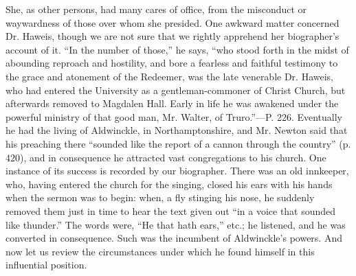 She, as other persons, had many cares of office,
from the misconduct or waywardness of those over whom she presided.
One awkward matter concerned Dr. Haweis, though we are not sure
that we rightly apprehend her biographer's account of it. ``In the
number of those,'' he says, ``who stood forth in the midst of
abounding reproach and hostility, and bore a fearless and faithful
testimony to the grace and atonement of the Redeemer, was the late
venerable Dr. Haweis, who had entered the University as a
gentleman-commoner of Christ Church, but afterwards removed to
Magdalen Hall. Early in life he was awakened under the powerful
ministry of that good man, Mr. Walter, of Truro.''—P. 226. Eventually
he had the living of Aldwinckle, in Northamptonshire, and Mr. Newton
said that his preaching there ``sounded like the report of a cannon
through the country'' (p. 420), and in consequence he attracted vast
congregations to his church. One instance of its success is recorded
by our biographer. There was an old innkeeper, who, having entered the
church for the singing, closed his ears with his hands when the sermon
was to begin: when, a fly stinging his nose, he suddenly removed them
just in time to hear the text given out ``in a voice that sounded like
thunder.'' The words were, ``He that hath ears,'' etc.; he listened, and
he was converted in consequence. Such was the incumbent of Aldwinckle's
powers. And now let us review the circumstances under which he found
himself in this influential position.

